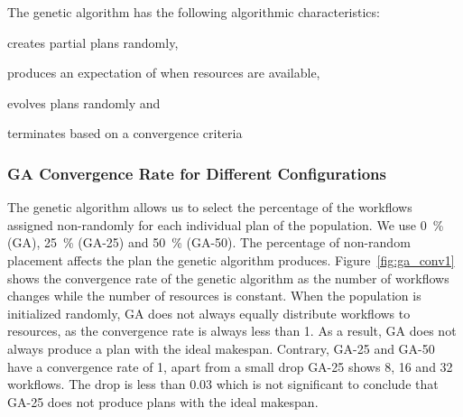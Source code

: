 The genetic algorithm has the following algorithmic characteristics:
\begin{inparaenum}[1)]
    \item creates partial plans randomly,
    \item produces an expectation of when resources are available,
    \item evolves plans randomly and
    \item terminates based on a convergence criteria
\end{inparaenum}

\subsubsection*{GA Convergence Rate for Different Configurations}
The genetic algorithm allows us to select the percentage of the workflows 
assigned non-randomly for each individual plan of the population. We use 0~\% 
(GA), 25~\% (GA-25) and 50~\% (GA-50). The percentage of non-random placement 
affects the plan the genetic algorithm produces. Figure~\ref{fig:ga_conv1} 
shows the convergence rate of the genetic algorithm as the number of workflows 
changes while the number of resources is constant. When the population is 
initialized randomly, GA does not always equally distribute workflows to 
resources, as the convergence rate is always less than 1. As a result, GA does 
not always produce a plan with the ideal makespan. Contrary, GA-25 and GA-50 
have a convergence rate of 1, apart from a small drop GA-25 shows 8, 16 and 32 
workflows. The drop is less than 0.03 which is not significant to conclude 
that GA-25 does not produce plans with the ideal makespan.

